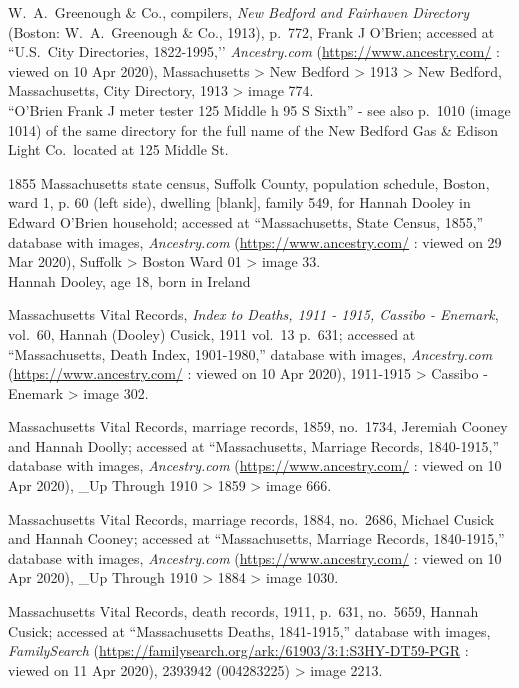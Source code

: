 \begin{thebibliography}{999}
	W.\ A.\ Greenough \& Co., compilers, \textit{New Bedford and Fairhaven Directory} (Boston: W.\ A.\ Greenough \& Co., 1913), p.\ 772, Frank J O'Brien; accessed at ``U.S.\ City Directories, 1822-1995,’’ \textit{Ancestry.com} (\url{https://www.ancestry.com/} : viewed on 10 Apr 2020), Massachusetts > New Bedford > 1913 > New Bedford, Massachusetts, City Directory, 1913 > image 774.\\
	``O'Brien Frank J meter tester 125 Middle h 95 S Sixth'' - see also p.\ 1010 (image 1014) of the same directory for the full name of the New Bedford Gas \& Edison Light Co.\ located at 125 Middle St.
	
	1855 Massachusetts state census, Suffolk County, population schedule, Boston, ward 1, p. 60 (left side), dwelling [blank], family 549, for Hannah Dooley in Edward O'Brien household; accessed at ``Massachusetts, State Census, 1855,'' database with images, \textit{Ancestry.com} (\url{https://www.ancestry.com/} : viewed on 29 Mar 2020), Suffolk > Boston Ward 01 > image 33.\\
	Hannah Dooley, age 18, born in Ireland
	
	Massachusetts Vital Records, \textit{Index to Deaths, 1911 - 1915, Cassibo - Enemark}, vol.\ 60, Hannah (Dooley) Cusick, 1911 vol.\ 13 p.\ 631; accessed at ``Massachusetts, Death Index, 1901-1980,'' database with images, \textit{Ancestry.com} (\url{https://www.ancestry.com/} : viewed on 10 Apr 2020), 1911-1915 > Cassibo - Enemark > image 302.
	
	Massachusetts Vital Records, marriage records, 1859, no.\ 1734, Jeremiah Cooney and Hannah Doolly; accessed at ``Massachusetts, Marriage Records, 1840-1915,'' database with images, \textit{Ancestry.com} (\url{https://www.ancestry.com/} : viewed on 10 Apr 2020), \_Up Through 1910 > 1859 > image 666.
	
	Massachusetts Vital Records, marriage records, 1884, no.\ 2686, Michael Cusick and Hannah Cooney; accessed at ``Massachusetts, Marriage Records, 1840-1915,'' database with images, \textit{Ancestry.com} (\url{https://www.ancestry.com/} : viewed on 10 Apr 2020), \_Up Through 1910 > 1884 > image 1030.
	
	Massachusetts Vital Records, death records, 1911, p.\ 631, no.\ 5659, Hannah Cusick; accessed at ``Massachusetts Deaths, 1841-1915,'' database with images, \textit{FamilySearch} (\url{https://familysearch.org/ark:/61903/3:1:S3HY-DT59-PGR} : viewed on 11 Apr 2020), 2393942 (004283225) > image 2213.
	

\end{thebibliography}
